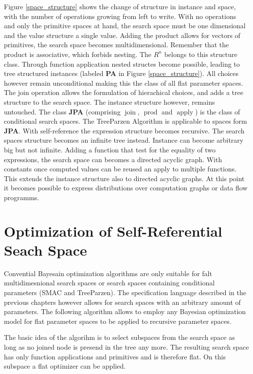 \documentclass[english]{article}
\newcommand{\join}{\operatorname{join}}
\newcommand{\apply}{\operatorname{apply}}
\newcommand{\prot}{\operatorname{prod}}
\begin{document}
Figure \ref{space_structure} shows the change of structure in instance and space, with the number of operations growing from left to write.
With no operations and only the primitive spaces at hand, the search space must be one dimensional and the value structure a single value.
Adding the product allows for vectors of primitives, the search space becomes multidimensional. Remember that the product is associative, which forbids nesting. The $R^n$ belongs to this structure class.
Through function application nested structes become possible, leading to tree structured instances (labeled \textbf{PA} in Figure \ref{space_structure}). All choices however remain unconditional making this the class of all flat parameter spaces.
The join operation allows the formulation of hierachical choices, and adds a tree structure to the search space. The instance structure however, remains untouched.
The class \textbf{JPA} (comprising $\join$, $\prot$ and $\apply$) is the class of conditional search spaces. The TreeParzen Algorithm is applicable to spaces form \textbf{JPA}.
With self-reference the expression structure becomes recursive. The search spaces structure becomes an infinite tree instead. Instance can become arbitrary big but not infinite.
Adding a function that test for the equality of two expressions, the search space can becomes a directed acyclic graph.
With constants once computed values can be reused an apply to multiple functions. This extends the instance structure also to directed acyclic graphs. At this point it becomes possible to express distributions over computation graphs or data flow programms.




\section{Optimization of Self-Referential Seach Space}
Convential Bayesain optimization algorithms are only suitable for falt multidimesnional search spaces or search spaces containing conditional parameters (SMAC and TreeParzen). The specification language described in the previous chapters however allows for search spaces with an arbitrary amount of parameters. The following algorithm allows to employ any Bayesian optimization model for flat parameter spaces to be applied to recursive parameter spaces.

The basic idea of the algorihm is to select subspaces from the search space as long as no joined node is presend in the tree any more. The resulting search space has only function applications and primitives and is therefore flat. On this subspace a flat optimizer can be applied.
\end{document}
